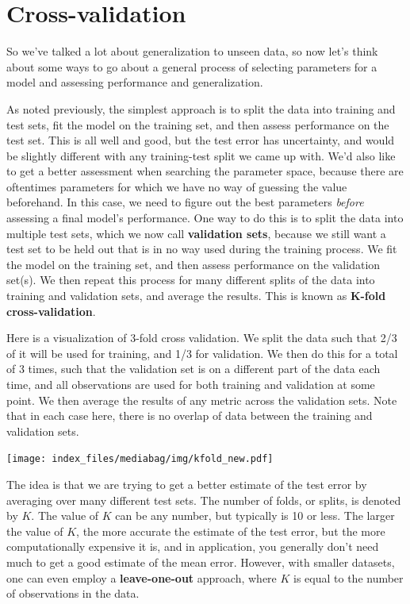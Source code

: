 \documentclass[
  letterpaper,
]{krantz}
\begin{document}
\section{Cross-validation}\label{sec-ml-cv}

So we've talked a lot about generalization to unseen data, so now let's
think about some ways to go about a general process of selecting
parameters for a model and assessing performance and generalization.

As noted previously, the simplest approach is to split the data into
training and test sets, fit the model on the training set, and then
assess performance on the test set. This is all well and good, but the
test error has uncertainty, and would be slightly different with any
training-test split we came up with. We'd also like to get a better
assessment when searching the parameter space, because there are
oftentimes parameters for which we have no way of guessing the value
beforehand. In this case, we need to figure out the best parameters
\emph{before} assessing a final model's performance. One way to do this
is to split the data into multiple test sets, which we now call
\textbf{validation sets}, because we still want a test set to be held
out that is in no way used during the training process. We fit the model
on the training set, and then assess performance on the validation
set(s). We then repeat this process for many different splits of the
data into training and validation sets, and average the results. This is
known as \textbf{K-fold cross-validation}.

Here is a visualization of 3-fold cross validation. We split the data
such that 2/3 of it will be used for training, and 1/3 for validation.
We then do this for a total of 3 times, such that the validation set is
on a different part of the data each time, and all observations are used
for both training and validation at some point. We then average the
results of any metric across the validation sets. Note that in each case
here, there is no overlap of data between the training and validation
sets.

\texttt{[image: index\_files/mediabag/img/kfold\_new.pdf]}

The idea is that we are trying to get a better estimate of the test
error by averaging over many different test sets. The number of folds,
or splits, is denoted by \(K\). The value of \(K\) can be any number,
but typically is 10 or less. The larger the value of \(K\), the more
accurate the estimate of the test error, but the more computationally
expensive it is, and in application, you generally don't need much to
get a good estimate of the mean error. However, with smaller datasets,
one can even employ a \textbf{leave-one-out} approach, where \(K\) is
equal to the number of observations in the data.
\end{document}

